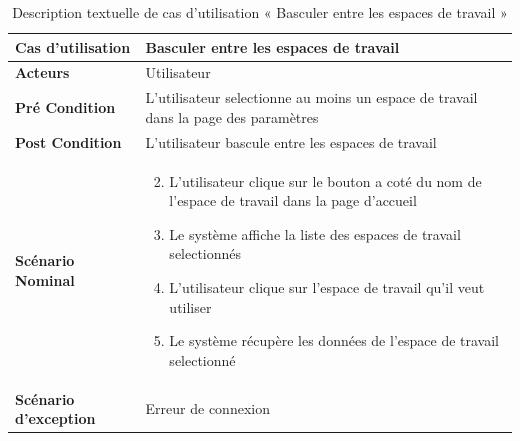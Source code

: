 
\begin{longtable}{|p{5cm}|p{10cm}|}
  \caption{Description textuelle de cas d'utilisation « Basculer entre les espaces de travail »} \label{tab:use_case_basculer_espaces_travail} \\
  \hline
  \textbf{Cas d'utilisation}&Basculer entre les espaces de travail\\
  \hline
  \textbf{Acteurs}&Utilisateur\\
  \hline
  \textbf{Pré Condition}&L'utilisateur selectionne au moins un espace de travail dans la page des paramètres\\
  \hline
  \textbf{Post Condition}&L'utilisateur bascule entre les espaces de travail\\
  \hline
  \textbf{Scénario Nominal}&
  \vspace{-\baselineskip}
  \begin{enumerate}
    \setcounter{enumi}{1}
        \item L'utilisateur clique sur le bouton a coté du nom de l'espace de travail dans la page d'accueil
        \item Le système affiche la liste des espaces de travail selectionnés
        \item L'utilisateur clique sur l'espace de travail qu'il veut utiliser
        \item Le système récupère les données de l'espace de travail selectionné
  \end{enumerate}\\
  \hline
  \textbf{Scénario d'exception}&Erreur de connexion\\
  \hline

  \end{longtable}




